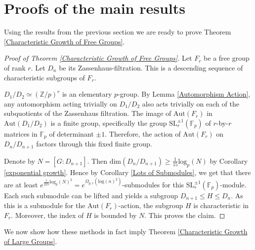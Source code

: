 \documentclass[letterpaper]{amsart}
\begin{document}
\section{Proofs of the main results}
Using the results from the previous section we are ready to prove Theorem \ref{Characteristic Growth of Free Groups}.
\begin{proof}[Proof of Theorem \ref{Characteristic Growth of Free Groups}]
Let $F_r$ be a free group of rank $r$. Let $D_n$ be its Zassenhaus-filtration. This is a descending sequence of characteristic subgroups of $F_r$.

$D_1 / D_2 \simeq (\mathbb{Z}/p)^r$ is an elementary $p$-group. By Lemma \ref{Automorphism Action}, any automorphism acting trivially on $D_1 / D_2$ also acts trivially on each of the subquotients of the Zassenhaus filtration.
The image of $\mathrm{Aut}(F_r)$ in $\mathrm{Aut}(D_1/D_2)$ is a finite group, specifically the group $\mathrm{SL}^{\pm1}_r(\mathbb{F}_p)$ of $r$-by-$r$ matrices in $\mathbb{F}_p$ of determinant $\pm 1$. Therefore, the action of $\mathrm{Aut}(F_r)$ on $D_n/D_{n+1}$ factors through this fixed finite group.

Denote by $N = [G : D_{n + 1}]$. Then $\mathrm{dim}(D_n / D_{n + 1}) \geq \frac{1}{15}\mathrm{log}_p(N)$ by Corollary \ref{exponential growth}.
Hence by Corollary \ref{Lots of Submodules}, we get that there are at least $e^{\frac{c}{225}\mathrm{log}_p(N)^2} = e^{\Omega_{p, r}(\mathrm{log}(n)^2)}$-submodules for this $\mathrm{SL}_r^{\pm 1}(\mathbb{F}_p)$-module. Each such submodule can be lifted and yields a subgroup $D_{n + 1} \leq H \leq D_n$. As this is a submodule for the $\mathrm{Aut}(F_r)$-action, the subgroup $H$ is characteristic in $F_r.$ Moreover, the index of $H$ is bounded by $N$. This proves the claim.
\end{proof}
We now show how these methods in fact imply Theorem \ref{Characteristic Growth of Large Groups}.
\end{document}
